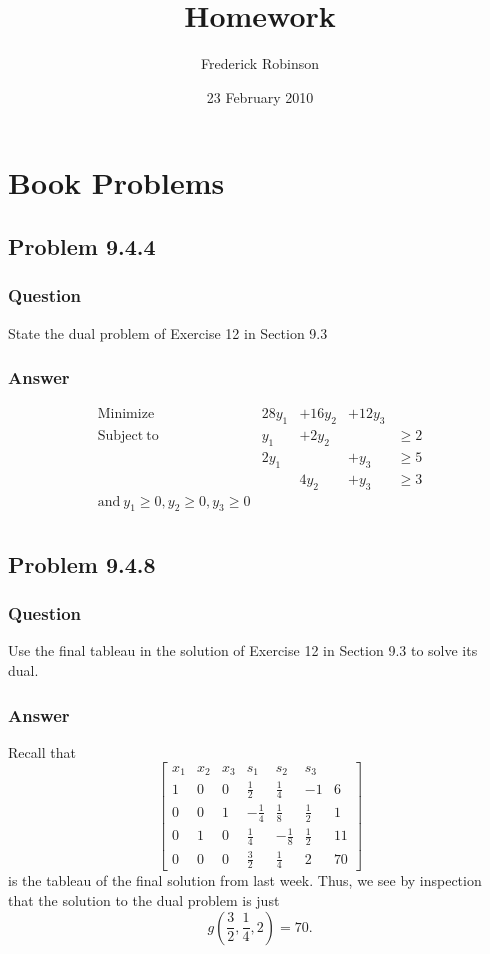 \documentclass[12pt]{article}
\title{Homework}
\author{Frederick Robinson}
\date{23 February 2010}
\begin{document}

   \maketitle

\setcounter{tocdepth}{2} 


\section{Book Problems}

\subsection{Problem 9.4.4}
\subsubsection{Question}
State the dual problem of Exercise 12 in Section 9.3
\subsubsection{Answer}

\[\begin{array}{lrrrr}
\mathrm{Minimize } & 28 y_1 & + 16 y_2  &+ 12 y_3 \\
\mathrm{Subject\ to} & y_1 &+ 2 y_2& &\geq 2 \\
 &2 y_1&& + y_3 & \geq 5\\
&&4y_2 &+ y_3& \geq 3\\
\mathrm{and\ } y_1\geq 0 , y_2 \geq 0, y_3 \geq 0\\
\end{array}\]


\subsection{Problem 9.4.8}
\subsubsection{Question}
Use the final tableau in the solution of Exercise 12 in Section 9.3 to solve its dual.
\subsubsection{Answer}

Recall  that
\[\left[\begin{array}{lll|lll|l}
x_1& x_2&x_3&s_1& s_2 & s_3 & \\
\hline 
1 & 0 &0&\frac{1}{2}&\frac{1}{4}&-1&6\\
0&0&1&-\frac{1}{4}&\frac{1}{8}&\frac{1}{2}&1\\
0&1&0&\frac{1}{4}&-\frac{1}{8}&\frac{1}{2}&11\\
\hline
0&0&0&\frac{3}{2}&\frac{1}{4}&2&70
\end{array}\right]
\]
is the tableau of the final solution from last week. Thus, we see by inspection that the solution to the dual problem is just
\[ g\left(\frac{3}{2},\frac{1}{4},2\right) = 70.\]
\end{document}
